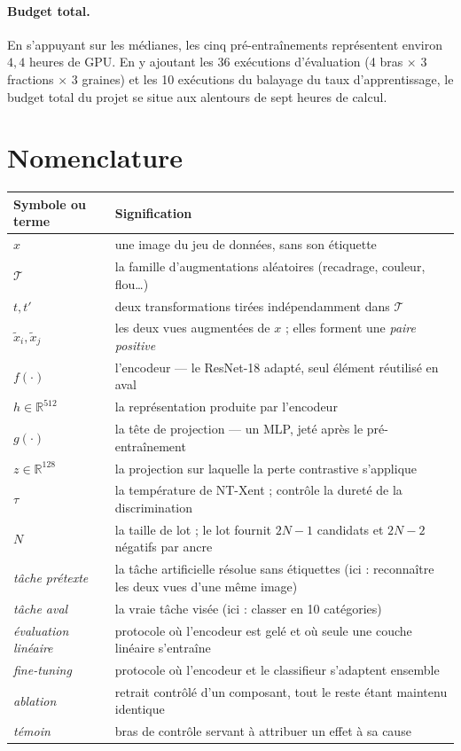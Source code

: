 \documentclass[11pt,a4paper]{article}
\begin{document}
\paragraph{Budget total.} En s'appuyant sur les médianes, les cinq pré-entraînements
représentent environ $4{,}4$ heures de GPU. En y ajoutant les 36 exécutions d'évaluation
(4 bras $\times$ 3 fractions $\times$ 3 graines) et les 10 exécutions du balayage du taux
d'apprentissage, le budget total du projet se situe aux alentours de sept heures de calcul.

\section{Nomenclature}
\label{ann:nomenclature}

\begin{table}[htbp]
\centering\small
\begin{tabularx}{\textwidth}{@{}lX@{}}
\toprule
\textbf{Symbole ou terme} & \textbf{Signification} \\
\midrule
$x$ & une image du jeu de données, sans son étiquette \\
$\mathcal{T}$ & la famille d'augmentations aléatoires (recadrage, couleur, flou…) \\
$t, t'$ & deux transformations tirées indépendamment dans $\mathcal{T}$ \\
$\tilde{x}_i, \tilde{x}_j$ & les deux vues augmentées de $x$ ; elles forment une \emph{paire positive} \\
$f(\cdot)$ & l'encodeur — le ResNet-18 adapté, seul élément réutilisé en aval \\
$h \in \mathbb{R}^{512}$ & la représentation produite par l'encodeur \\
$g(\cdot)$ & la tête de projection — un MLP, jeté après le pré-entraînement \\
$z \in \mathbb{R}^{128}$ & la projection sur laquelle la perte contrastive s'applique \\
$\tau$ & la température de NT-Xent ; contrôle la dureté de la discrimination \\
$N$ & la taille de lot ; le lot fournit $2N-1$ candidats et $2N-2$ négatifs par ancre \\
\addlinespace
\emph{tâche prétexte} & la tâche artificielle résolue sans étiquettes (ici : reconnaître les deux vues d'une même image) \\
\emph{tâche aval} & la vraie tâche visée (ici : classer en 10 catégories) \\
\emph{évaluation linéaire} & protocole où l'encodeur est gelé et où seule une couche linéaire s'entraîne \\
\emph{fine-tuning} & protocole où l'encodeur et le classifieur s'adaptent ensemble \\
\emph{ablation} & retrait contrôlé d'un composant, tout le reste étant maintenu identique \\
\emph{témoin} & bras de contrôle servant à attribuer un effet à sa cause \\
\bottomrule
\end{tabularx}
\end{table}
\end{document}
